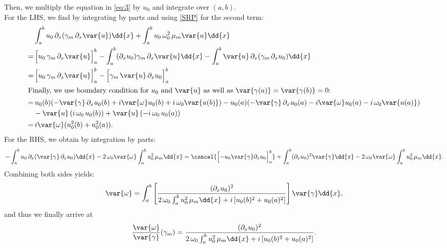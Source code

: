 Then, we multiply the equation in \eqref{eq:3} by $u_0$ and integrate over $(a,b)$.\\
For the LHS, we find by integrating by parts and using \eqref{SRP} for the second term:
\begin{align*}
    &\int_a^b u_0 \, \partial_x (\gamma_m \, \partial_x \var{u}) \dd{x} + \int_a^b u_0 \, \omega_0^2 \, \mu_m \var{u} \dd{x} \\
    =&\left[ u_0 \, \gamma_m \, \partial_x \var{u} \vphantom{\frac{a}{b}}\right]_a^b - \int_a^b (\partial_x u_0) \gamma_m\, \partial_x \var{u} \dd{x} - \int_a^b \var{u} \, \partial_x(\gamma_m \, \partial_x u_0) \dd{x} \\
    =&\left[ u_0 \,  \gamma_m \, \partial_x \var{u} \vphantom{\frac{a}{b}}\right]_a^b - \left[\gamma_m \,\var{u} \, \partial_x u_0 \vphantom{\frac{a}{b}} \right]_a^b\\
    \intertext{Finally, we use boundary condition for $u_0$ and $\var{u}$ as well as $\var{\gamma(a)} = \var{\gamma(b)} = 0$:}
    =& \, u_0(b) (- \var{\gamma} \, \partial_x u_0(b) + i \var{\omega} u_0(b) + i\, \omega_0 \var{u(b)})
    - u_0(a) (-\var{\gamma} \, \partial_x u_0(a) -i\var{\omega} u_0(a) - i\, \omega_0 \var{u(a)})\\
    &- \var{u} \, (i \, \omega_0 \, u_0(b)) + \var{u} \, (-i \, \omega_0 \, u_0(a))\\
    =&\,  i \var{\omega} (u_0^2(b) + u_0^2(a)).
\end{align*}
For the RHS, we obtain by integration by parts:
\begin{align*}
    -\int_a^b u_0 \, \partial_x(\var{\gamma} \, \partial_x u_0)\dd{x} - 2\, \omega_0 \var{\omega}\int_a^b u_0^2 \, \mu_m \dd{x} = \cancel{\left[-u_0 \var{\gamma} \partial_x u_0 \vphantom{\frac{a}{b}} \right]_a^b} + \int_a^b (\partial_x u_0)^2 \var{\gamma} \dd{x} - 2\, \omega_0 \var{\omega}\int_a^b u_0^2 \, \mu_m \dd{x}.
\end{align*}
Combining both sides yields:
\begin{equation*}
    \var{\omega}= \int_a^b \left[\frac{(\partial_x u_0)^2}{2 \, \omega_0 \int_a^b u_0^2 \, \mu_m \dd{x} + i \left[u_0(b)^2 + u_0(a)^2\right]} \right] \var{\gamma} \dd{x},
\end{equation*}
and thus we finally arrive at
\begin{equation}
    \frac{\var{\omega}}{\var{\gamma}}(\gamma_m) = \frac{(\partial_x u_0)^2}{2 \, \omega_0 \int_a^b u_0^2 \, \mu_m \dd{x} + i \left[u_0(b)^2 + u_0(a)^2\right]}.
\end{equation}

